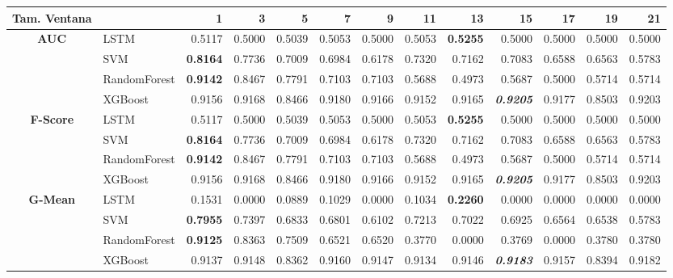 \begin{table}[H]
	\centering
	\begin{adjustbox}{max width=14cm}
		\begin{tabular}{|c|l|r|r|r|r|r|r|r|r|r|r|r|}
			\hline
			\textbf{Tam. Ventana} &         &      1  &      3  &      5  &      7  &      9  &      11 &      13 &      15 &      17 &      19 &      21 \\
			\hline
			\textbf{AUC} &  LSTM &  0.5117 &  0.5000 &  0.5039 &  0.5053 &  0.5000 &  0.5053 & \textbf{  0.5255 } &  0.5000 &  0.5000 &  0.5000 &  0.5000 \\
			&  SVM & \textbf{  0.8164 } &  0.7736 &  0.7009 &  0.6984 &  0.6178 &  0.7320 &  0.7162 &  0.7083 &  0.6588 &  0.6563 &  0.5783 \\
			&  RandomForest & \textbf{  0.9142 } &  0.8467 &  0.7791 &  0.7103 &  0.7103 &  0.5688 &  0.4973 &  0.5687 &  0.5000 &  0.5714 &  0.5714 \\
			&  XGBoost &  0.9156 &  0.9168 &  0.8466 &  0.9180 &  0.9166 &  0.9152 &  0.9165 & \textit{ \textbf{  0.9205 } } &  0.9177 &  0.8503 &  0.9203 \\
			\hline
			\textbf{F-Score} &  LSTM &  0.5117 &  0.5000 &  0.5039 &  0.5053 &  0.5000 &  0.5053 & \textbf{  0.5255 } &  0.5000 &  0.5000 &  0.5000 &  0.5000 \\
			&  SVM & \textbf{  0.8164 } &  0.7736 &  0.7009 &  0.6984 &  0.6178 &  0.7320 &  0.7162 &  0.7083 &  0.6588 &  0.6563 &  0.5783 \\
			&  RandomForest & \textbf{  0.9142 } &  0.8467 &  0.7791 &  0.7103 &  0.7103 &  0.5688 &  0.4973 &  0.5687 &  0.5000 &  0.5714 &  0.5714 \\
			&  XGBoost &  0.9156 &  0.9168 &  0.8466 &  0.9180 &  0.9166 &  0.9152 &  0.9165 & \textit{ \textbf{  0.9205 } } &  0.9177 &  0.8503 &  0.9203 \\
			\hline
			\textbf{G-Mean} &  LSTM &  0.1531 &  0.0000 &  0.0889 &  0.1029 &  0.0000 &  0.1034 & \textbf{  0.2260 } &  0.0000 &  0.0000 &  0.0000 &  0.0000 \\
			&  SVM & \textbf{  0.7955 } &  0.7397 &  0.6833 &  0.6801 &  0.6102 &  0.7213 &  0.7022 &  0.6925 &  0.6564 &  0.6538 &  0.5783 \\
			&  RandomForest & \textbf{  0.9125 } &  0.8363 &  0.7509 &  0.6521 &  0.6520 &  0.3770 &  0.0000 &  0.3769 &  0.0000 &  0.3780 &  0.3780 \\
			&  XGBoost &  0.9137 &  0.9148 &  0.8362 &  0.9160 &  0.9147 &  0.9134 &  0.9146 & \textit{ \textbf{  0.9183 } } &  0.9157 &  0.8394 &  0.9182 \\

\end{tabular}
\end{adjustbox}
\end{table}
